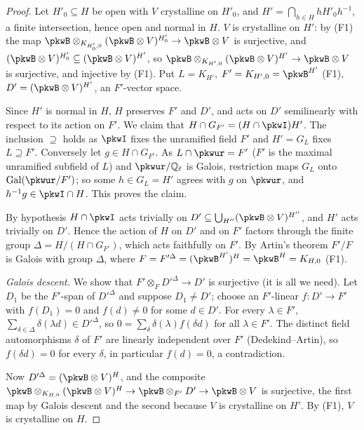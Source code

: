 \documentclass[10pt]{amsart}
\theoremstyle{definition}
\theoremstyle{remark}
\newcommand{\Q}{\mathbb Q}
\begin{document}
\begin{proof}
Let $H'_0\subseteq H$ be open with $V$ crystalline on $H'_0$, and $H'=\bigcap_{h\in H}hH'_0h^{-1}$, a
finite intersection, hence open and normal in $H$. $V$ is crystalline on $H'$: by (F1) the map
$\pkwB\otimes_{K_{H'_0,0}}(\pkwB\otimes V)^{H'_0}\to\pkwB\otimes V$ is surjective, and
$(\pkwB\otimes V)^{H'_0}\subseteq(\pkwB\otimes V)^{H'}$, so $\pkwB\otimes_{K_{H',0}}(\pkwB\otimes V)^{H'}
\to\pkwB\otimes V$ is surjective, and injective by (F1). Put $L=K_{H'}$, $F'=K_{H',0}=\pkwB^{H'}$ (F1),
$D'=(\pkwB\otimes V)^{H'}$, an $F'$-vector space.

Since $H'$ is normal in $H$, $H$ preserves $F'$ and $D'$, and acts on $D'$ semilinearly with respect to its
action on $F'$. We claim that $H\cap G_{F'}=(H\cap\pkwI)H'$. The inclusion $\supseteq$ holds as $\pkwI$
fixes the unramified field $F'$ and $H'=G_L$ fixes $L\supseteq F'$. Conversely let $g\in H\cap G_{F'}$.
As $L\cap\pkwur=F'$ ($F'$ is the maximal unramified subfield of $L$) and $\pkwur/\Q_\ell$ is Galois, restriction
maps $G_L$ onto $\operatorname{Gal}(\pkwur/F')$; so some $h\in G_L=H'$ agrees with $g$ on $\pkwur$, and
$h^{-1}g\in\pkwI\cap H$. This proves the claim.

By hypothesis $H\cap\pkwI$ acts trivially on $D'\subseteq\bigcup_{H''}(\pkwB\otimes V)^{H''}$, and $H'$ acts
trivially on $D'$. Hence the action of $H$ on $D'$ and on $F'$ factors through the finite group
$\Delta=H/(H\cap G_{F'})$, which acts faithfully on $F'$. By Artin's theorem $F'/F$ is Galois with group
$\Delta$, where $F=F'^{\Delta}=(\pkwB^{H'})^H=\pkwB^H=K_{H,0}$ (F1).

\emph{Galois descent.} We show that $F'\otimes_FD'^{\Delta}\to D'$ is surjective (it is all we need). Let
$D_1$ be the $F'$-span of $D'^\Delta$ and suppose $D_1\ne D'$; choose an $F'$-linear $f\colon D'\to F'$ with
$f(D_1)=0$ and $f(d)\ne0$ for some $d\in D'$. For every $\lambda\in F'$, $\sum_{\delta\in\Delta}\delta(\lambda d)
\in D'^\Delta$, so $0=\sum_\delta\delta(\lambda)f(\delta d)$ for all $\lambda\in F'$. The distinct field
automorphisms $\delta$ of $F'$ are linearly independent over $F'$ (Dedekind--Artin), so $f(\delta d)=0$ for
every $\delta$, in particular $f(d)=0$, a contradiction.

Now $D'^\Delta=(\pkwB\otimes V)^H$, and the composite
$\pkwB\otimes_{K_{H,0}}(\pkwB\otimes V)^H\to\pkwB\otimes_{F'}D'\to\pkwB\otimes V$ is surjective, the
first map by Galois descent and the second because $V$ is crystalline on $H'$. By (F1), $V$ is crystalline
on $H$.
\end{proof}
\end{document}
